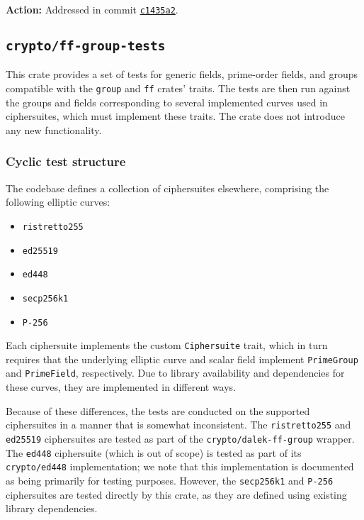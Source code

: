 \documentclass{article}
\begin{document}
\textbf{Action:} Addressed in commit \href{https://github.com/serai-dex/serai/commit/c1435a20455b0469526f534354aa3f0ac7209d83}{\texttt{c1435a2}}.


\subsection{\texttt{crypto/ff-group-tests}}

This crate provides a set of tests for generic fields, prime-order fields, and groups compatible with the \texttt{group} and \texttt{ff} crates' traits.
The tests are then run against the groups and fields corresponding to several implemented curves used in ciphersuites, which must implement these traits.
The crate does not introduce any new functionality.


\subsubsection{Cyclic test structure}

The codebase defines a collection of ciphersuites elsewhere, comprising the following elliptic curves:
\begin{itemize}
	\item \texttt{ristretto255}
	\item \texttt{ed25519}
	\item \texttt{ed448}
	\item \texttt{secp256k1}
	\item \texttt{P-256}
\end{itemize}
Each ciphersuite implements the custom \texttt{Ciphersuite} trait, which in turn requires that the underlying elliptic curve and scalar field implement \texttt{PrimeGroup} and \texttt{PrimeField}, respectively.
Due to library availability and dependencies for these curves, they are implemented in different ways.

Because of these differences, the tests are conducted on the supported ciphersuites in a manner that is somewhat inconsistent.
The \texttt{ristretto255} and \texttt{ed25519} ciphersuites are tested as part of the \texttt{crypto/dalek-ff-group} wrapper.
The \texttt{ed448} ciphersuite (which is out of scope) is tested as part of its \texttt{crypto/ed448} implementation; we note that this implementation is documented as being primarily for testing purposes.
However, the \texttt{secp256k1} and \texttt{P-256} ciphersuites are tested directly by this crate, as they are defined using existing library dependencies.
\end{document}
